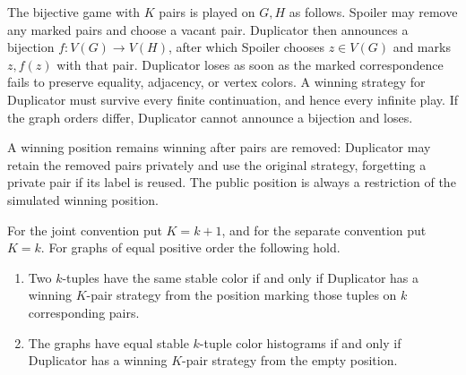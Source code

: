 \begin{definition}
\label{game:definition}
The bijective game with $K$ pairs is played on $G,H$ as follows.  Spoiler
may remove any marked pairs and choose a vacant pair.  Duplicator then
announces a bijection $f:V(G)\to V(H)$, after which Spoiler chooses
$z\in V(G)$ and marks $z,f(z)$ with that pair.  Duplicator loses as soon
as the marked correspondence fails to preserve equality, adjacency, or
vertex colors.  A winning strategy for Duplicator must survive every
finite continuation, and hence every infinite play.  If the graph orders
differ, Duplicator cannot announce a bijection and loses.
\end{definition}

A winning position remains winning after pairs are removed: Duplicator
may retain the removed pairs privately and use the original strategy,
forgetting a private pair if its label is reused. The public position
is always a restriction of the simulated winning position.

\begin{lemma}
\label{game:wl}
For the joint convention put $K=k+1$, and for the separate convention put
$K=k$.  For graphs of equal positive order the following hold.
\begin{enumerate}
 \item Two $k$-tuples have the same stable color if and only if
 Duplicator has a winning $K$-pair strategy from the position marking
 those tuples on $k$ corresponding pairs.
 \item The graphs have equal stable $k$-tuple color histograms if and
 only if Duplicator has a winning $K$-pair strategy from the empty
 position.
\end{enumerate}
\end{lemma}

